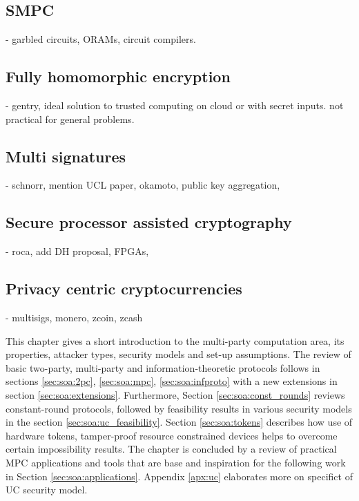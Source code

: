 \documentclass[
  digital, %
  twoside, %
  table,   %
  lof,     %
  lot,     %
]{fithesis3}
\newcounter{ph4_show_guides}
\theoremstyle{definition}
\theoremstyle{remark}
\begin{document}
\begin{ecmmnt}
    \subsection{SMPC}
    - garbled circuits, ORAMs, circuit compilers.
    
    \subsection{Fully homomorphic encryption}
    - gentry, ideal solution to trusted computing on cloud or with secret inputs. not practical for general problems.
    
    \subsection{Multi signatures}
    - schnorr, mention UCL paper, okamoto, public key aggregation,  
    
    \subsection{Secure processor assisted cryptography}
    - roca, add DH proposal, FPGAs, 
    
    \subsection{Privacy centric cryptocurrencies}
    - multisigs, monero, zcoin, zcash
\end{ecmmnt}

This chapter gives a short introduction to the multi-party computation area, its properties, attacker types, security models and set-up assumptions. The review of basic two-party, multi-party and information-theoretic protocols follows in sections \ref{sec:soa:2pc}, \ref{sec:soa:mpc}, \ref{sec:soa:infproto} with a new extensions in section \ref{sec:soa:extensions}. Furthermore, Section \ref{sec:soa:const_rounds} reviews constant-round protocols, followed by feasibility results in various security models in the section \ref{sec:soa:uc_feasibility}. Section \ref{sec:soa:tokens} describes how use of hardware tokens, tamper-proof resource constrained devices helps to overcome certain impossibility results. The chapter is concluded by a review of practical MPC applications and tools that are base and inspiration for the following work in Section \ref{sec:soa:applications}. Appendix \ref{apx:uc} elaborates more on specifict of UC security model.
\end{document}
